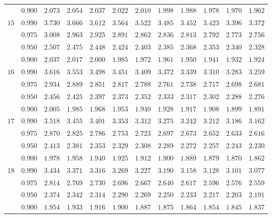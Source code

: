 \documentclass[11pt]{article}
\theoremstyle{definition}
\begin{document}
\begin{table}[H]
\begin{tabularx}{\linewidth}{c | c | c c c c c c c c c c}
		& $0.900$ & $2.073$ & $2.054$ & $2.037$ & $2.022$ & $2.010$ & $1.998$ & $1.988$ & $1.978$ & $1.970$ & $1.962$ \\
		$15$ & $0.990$ & $3.730$ & $3.666$ & $3.612$ & $3.564$ & $3.522$ & $3.485$ & $3.452$ & $3.423$ & $3.396$ & $3.372$ \\
		& $0.975$ & $3.008$ & $2.963$ & $2.925$ & $2.891$ & $2.862$ & $2.836$ & $2.813$ & $2.792$ & $2.773$ & $2.756$ \\
		& $0.950$ & $2.507$ & $2.475$ & $2.448$ & $2.424$ & $2.403$ & $2.385$ & $2.368$ & $2.353$ & $2.340$ & $2.328$ \\
		& $0.900$ & $2.037$ & $2.017$ & $2.000$ & $1.985$ & $1.972$ & $1.961$ & $1.950$ & $1.941$ & $1.932$ & $1.924$ \\
		$16$ & $0.990$ & $3.616$ & $3.553$ & $3.498$ & $3.451$ & $3.409$ & $3.372$ & $3.339$ & $3.310$ & $3.283$ & $3.259$ \\
		& $0.975$ & $2.934$ & $2.889$ & $2.851$ & $2.817$ & $2.788$ & $2.761$ & $2.738$ & $2.717$ & $2.698$ & $2.681$ \\
		& $0.950$ & $2.456$ & $2.425$ & $2.397$ & $2.373$ & $2.352$ & $2.333$ & $2.317$ & $2.302$ & $2.288$ & $2.276$ \\
		& $0.900$ & $2.005$ & $1.985$ & $1.968$ & $1.953$ & $1.940$ & $1.928$ & $1.917$ & $1.908$ & $1.899$ & $1.891$ \\
		$17$ & $0.990$ & $3.518$ & $3.455$ & $3.401$ & $3.353$ & $3.312$ & $3.275$ & $3.242$ & $3.212$ & $3.186$ & $3.162$ \\
		& $0.975$ & $2.870$ & $2.825$ & $2.786$ & $2.753$ & $2.723$ & $2.697$ & $2.673$ & $2.652$ & $2.633$ & $2.616$ \\
		& $0.950$ & $2.413$ & $2.381$ & $2.353$ & $2.329$ & $2.308$ & $2.289$ & $2.272$ & $2.257$ & $2.243$ & $2.230$ \\
		& $0.900$ & $1.978$ & $1.958$ & $1.940$ & $1.925$ & $1.912$ & $1.900$ & $1.889$ & $1.879$ & $1.870$ & $1.862$ \\
		$18$ & $0.990$ & $3.434$ & $3.371$ & $3.316$ & $3.269$ & $3.227$ & $3.190$ & $3.158$ & $3.128$ & $3.101$ & $3.077$ \\
		& $0.975$ & $2.814$ & $2.769$ & $2.730$ & $2.696$ & $2.667$ & $2.640$ & $2.617$ & $2.596$ & $2.576$ & $2.559$ \\
		& $0.950$ & $2.374$ & $2.342$ & $2.314$ & $2.290$ & $2.269$ & $2.250$ & $2.233$ & $2.217$ & $2.203$ & $2.191$ \\
		& $0.900$ & $1.954$ & $1.933$ & $1.916$ & $1.900$ & $1.887$ & $1.875$ & $1.864$ & $1.854$ & $1.845$ & $1.837$ \\

\end{tabularx}
\end{table}
\end{document}
